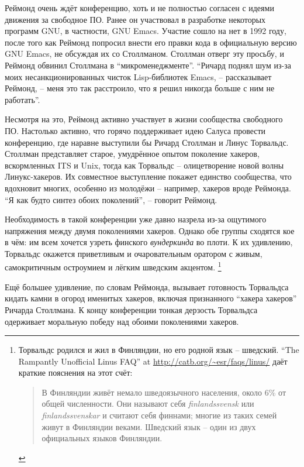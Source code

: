 Реймонд очень ждёт конференцию, хоть и не полностью согласен с идеями движения за свободное ПО. Ранее он участвовал в разработке некоторых программ GNU, в частности, GNU Emacs. Участие сошло на нет в 1992 году, после того как Реймонд попросил внести его правки кода в официальную версию GNU Emacs, не обсуждая их со Столлманом. Столлман отверг эту просьбу, и Реймонд обвинил Столлмана в \enquote{микроменеджменте}. \enquote{Ричард поднял шум из-за моих несанкционированных чисток Lisp-библиотек Emacs, -- рассказывает Реймонд, -- меня это так расстроило, что я решил никогда больше с ним не работать}.

Несмотря на это, Реймонд активно участвует в жизни сообщества свободного ПО. Настолько активно, что горячо поддерживает идею Салуса провести конференцию, где наравне выступили бы Ричард Столлман и Линус Торвальдс. Столлман представляет старое, умудрённое опытом поколение хакеров, вскормленных ITS и Unix, тогда как Торвальдс -- олицетворение новой волны Линукс-хакеров. Их совместное выступление покажет единство сообщества, что вдохновит многих, особенно из молодёжи -- например, хакеров вроде Реймонда. \enquote{Я как будто синтез обоих поколений}, -- говорит Реймонд.

Необходимость в такой конференции уже давно назрела из-за ощутимого напряжения между двумя поколениями хакеров. Однако обе группы сходятся кое в чём: им всем хочется узреть финского \textit{вундеркинда} во плоти. К их удивлению, Торвальдс окажется приветливым и очаровательным оратором с живым, самокритичным остроумием и лёгким шведским акцентом. \footnote{Торвальдс родился и жил в Финляндии, но его родной язык -- шведский. \enquote{The Rampantly Unofficial Linus FAQ} at \url{http://catb.org/~esr/faqs/linus/} даёт краткие пояснения на этот счёт:

\begin{quote}
В Финляндии живёт немало шведоязычного населения, около 6\% от общей численности. Они называют себя \textit{finlandssvensk} или \textit{finlandssvenskar} и считают себя финнами; многие из таких семей живут в Финляндии веками. Шведский язык -- один из двух официальных языков Финляндии.
\end{quote}}

Ещё большее удивление, по словам Реймонда, вызывает готовность Торвальдса кидать камни в огород именитых хакеров, включая признанного \enquote{хакера хакеров} Ричарда Столлмана. К концу конференции тонкая дерзость Торвальдса одерживает моральную победу над обоими поколениями хакеров.

